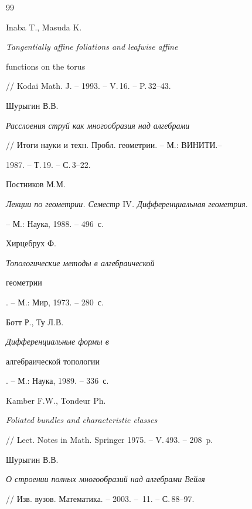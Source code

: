 \begin{thebibliography}{99}


Inaba T., Masuda K.


{\it Tangentially affine foliations and leafwise affine


functions on the torus}


// Kodai Math. J. --  1993. -- V.\,16. -- P.\,32--43.







Шурыгин В.В.


{\it Расслоения струй как многообразия над алгебрами}


// Итоги науки и техн. Пробл. геометрии. -- М.: ВИНИТИ.--


1987. -- Т.\,19. --  С.\,3--22.







Постников М.М.


{\it Лекции по геометрии. Семестр $\mathrm{IV}$. Дифференциальная геометрия}.


-- М.: Наука, 1988. -- 496~с.







Хирцебрух Ф. {\it Топологические методы в алгебраической


геометрии}. -- М.: Мир, 1973. --  280~с.







Ботт Р., Ту Л.В. {\it Дифференциальные формы в


алгебраической топологии}. -- М.: Наука, 1989. -- 336~с.







Kamber F.W., Tondeur Ph.


{\it Foliated bundles and characteristic classes}


// Lect. Notes in Math.  Springer 1975. -- V.\,493. -- 208~p.







Шурыгин В.В.


{\it О строении полных многообразий над алгебрами Вейля}


// Изв. вузов. Математика. -- 2003. -- \No\,11. -- С.\,88--97.





\end{thebibliography}





\vskip 1cm












\label{end}








